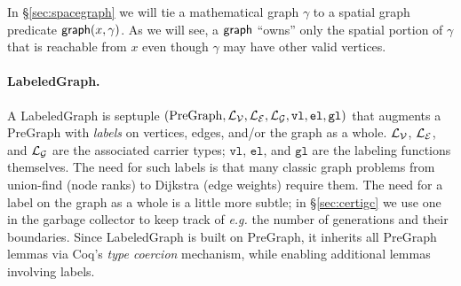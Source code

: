 \hide
{In \S\ref{sec:spacegraph} we will tie a mathematical graph $\gamma$ to
a spatial graph predicate
$\mathsf{graph}(x, \gamma)$.   As we will see, a $\mathsf{graph}$ ``owns'' only the
spatial portion of $\gamma$ that is reachable
from $x$ even though $\gamma$ may have other valid vertices.
} %



\vspace{-0.75ex}

\paragraph{LabeledGraph.}
A LabeledGraph is septuple $(\mathrm{PreGraph},\mathcal{L_{V}},\mathcal{L_{E}},\mathcal{L_{G}}, \mathtt{vl},\mathtt{el},\mathtt{gl})$ that augments a PreGraph with \emph{labels} on
vertices, edges, and/or the graph as a whole. $\mathcal{L_{V}}$, $\mathcal{L_{E}}$, and $\mathcal{L_{G}}$
are the associated carrier types; $\mathtt{vl}$, $\mathtt{el}$, and $\mathtt{gl}$
are the labeling functions themselves.
The need for such labels is that many classic graph problems from union-find (node ranks)
to Dijkstra (edge weights) require them.  The need for a label on the graph as a whole
is a little more subtle; in \S\ref{sec:certigc} we use one in the garbage collector
to keep track of \emph{e.g.} the number of generations and their boundaries.
Since LabeledGraph is built on PreGraph, it inherits all PreGraph lemmas via
Coq's \emph{type coercion} mechanism, while enabling additional lemmas involving labels.



